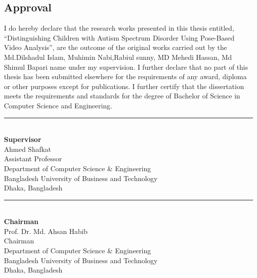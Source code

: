 \begin{center}
    \section*{Approval}
\end{center}


I do hereby declare that the research works presented in this thesis entitled, “Distinguishing Children with Autism Spectrum
Disorder Using Pose-Based Video Analysis”, are the outcome of the original works carried out by the Md.Dilshadul Islam, Muhimin Nabi,Rabiul sunny, MD Mehedi Hassan, Md Shimul Bapari  name under my supervision. I further declare that no part of this thesis has been submitted elsewhere for the requirements of any award, diploma or other purposes except for publications. I further certify that the dissertation meets the requirements and standards for the degree of Bachelor of Science in Computer Science and Engineering.

\vspace{12mm}

\noindent\rule{9.3cm}{0.2pt} \\ 
\textbf{Supervisor}\\
Ahmed Shafkat \\
Assistant Professor\\
Department of Computer Science \& Engineering \\
Bangladesh University of Business and Technology\\
Dhaka, Bangladesh


\vspace{16mm}

\begin{flushleft}
\noindent\rule{9.3cm}{0.2pt} \\ 
\textbf{Chairman} \null\hfill  \\
Prof. Dr. Md. Ahsan Habib \\
Chairman \\
Department of Computer Science \& Engineering \\
Bangladesh University of Business and Technology\\
Dhaka, Bangladesh\\
\end{flushleft}